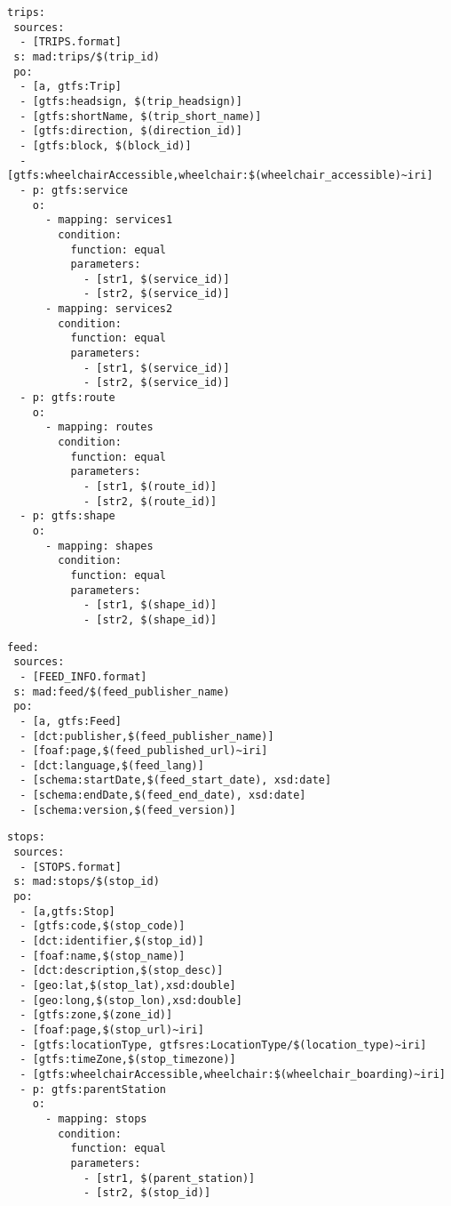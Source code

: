 \newpage
\begin{lstlisting}[caption=Trips TripleMap, label=lst:trips, basicstyle=\small,frame=single]
trips:
 sources:
  - [TRIPS.format]
 s: mad:trips/$(trip_id)
 po:
  - [a, gtfs:Trip]
  - [gtfs:headsign, $(trip_headsign)]
  - [gtfs:shortName, $(trip_short_name)]
  - [gtfs:direction, $(direction_id)]
  - [gtfs:block, $(block_id)]
  - [gtfs:wheelchairAccessible,wheelchair:$(wheelchair_accessible)~iri]
  - p: gtfs:service
    o:
      - mapping: services1
        condition:
          function: equal
          parameters:
            - [str1, $(service_id)]
            - [str2, $(service_id)]
      - mapping: services2
        condition:
          function: equal
          parameters:
            - [str1, $(service_id)]
            - [str2, $(service_id)]
  - p: gtfs:route
    o:
      - mapping: routes
        condition:
          function: equal
          parameters:
            - [str1, $(route_id)]
            - [str2, $(route_id)]
  - p: gtfs:shape
    o:
      - mapping: shapes
        condition:
          function: equal
          parameters:
            - [str1, $(shape_id)]
            - [str2, $(shape_id)]
\end{lstlisting}

\begin{lstlisting}[caption=Feed\_Info TripleMap, label=lst:feedInfo, basicstyle=\small,frame=single]
feed:
 sources:
  - [FEED_INFO.format]
 s: mad:feed/$(feed_publisher_name)
 po:
  - [a, gtfs:Feed]
  - [dct:publisher,$(feed_publisher_name)]
  - [foaf:page,$(feed_published_url)~iri]
  - [dct:language,$(feed_lang)]
  - [schema:startDate,$(feed_start_date), xsd:date]
  - [schema:endDate,$(feed_end_date), xsd:date]
  - [schema:version,$(feed_version)]
\end{lstlisting}
\begin{lstlisting}[caption=Stops TripleMap, label=lst:stops, basicstyle=\small,frame=single]
stops:
 sources:
  - [STOPS.format]
 s: mad:stops/$(stop_id)
 po:
  - [a,gtfs:Stop]
  - [gtfs:code,$(stop_code)]
  - [dct:identifier,$(stop_id)]
  - [foaf:name,$(stop_name)]
  - [dct:description,$(stop_desc)]
  - [geo:lat,$(stop_lat),xsd:double]
  - [geo:long,$(stop_lon),xsd:double]
  - [gtfs:zone,$(zone_id)]
  - [foaf:page,$(stop_url)~iri]
  - [gtfs:locationType, gtfsres:LocationType/$(location_type)~iri]
  - [gtfs:timeZone,$(stop_timezone)]
  - [gtfs:wheelchairAccessible,wheelchair:$(wheelchair_boarding)~iri]
  - p: gtfs:parentStation
    o:
      - mapping: stops
        condition:
          function: equal
          parameters:
            - [str1, $(parent_station)]
            - [str2, $(stop_id)]
\end{lstlisting}

